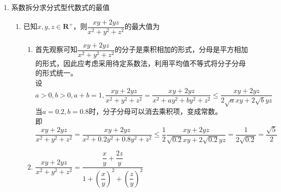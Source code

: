 \begin{enumerate}
\begin{enumerate}
\begin{jieda}
        故$a^2+\dfrac{16}{b(a-b)} \geq a^2 + \dfrac{64}{a^2} \geq 16$. 取等条件为$a = 2\sqrt{2}, b = \sqrt{2}$
    \end{jieda}
    \end{enumerate}
    \item 系数拆分求分式型代数式的最值
    \begin{enumerate}
        \item 已知$x, y, z \in \mathbf{R^+}$，则$\dfrac{xy+2yz}{x^2+y^2+z^2}$的最大值为
        \begin{jieda}
            \begin{enumerate}
                \item 首先观察可知$\dfrac{xy+2yz}{x^2+y^2+z^2}$的分子是乘积相加的形式，分母是平方相加的形式，因此应考虑采用待定系数法，利用平均值不等式将分子分母的形式统一。\\
                设$a>0, b > 0, a+b = 1, \dfrac{xy+2yz}{x^2+y^2+z^2} = \dfrac{xy+2yz}{x^2+ay^2+by^2+z^2} \leq \dfrac{xy+2yz}{2\sqrt{a}xy + 2\sqrt{b}yz}$ \\
                当$a = 0.2, b = 0.8$时，分子分母可以消去乘积项，变成常数。\\
                即$\dfrac{xy+2yz}{x^2+y^2+z^2} = \dfrac{xy+2yz}{x^2+0.2y^2+0.8y^2+z^2} \leq \dfrac{1}{2}\dfrac{xy+2yz}{\sqrt{0.2}xy + 2\sqrt{0.2}yz} = \dfrac{1}{2\sqrt{0.2}} = \dfrac{\sqrt{5}}{2}$
                \item $\dfrac{xy+2yz}{x^2+y^2+z^2} = \dfrac{\dfrac{x}{y}+\dfrac{2z}{y}}{1+\left(\dfrac{x}{y}\right)^2 + \left(\dfrac{z}{y}\right)^2}$


\end{enumerate}
\end{jieda}
\end{enumerate}
\end{enumerate}
